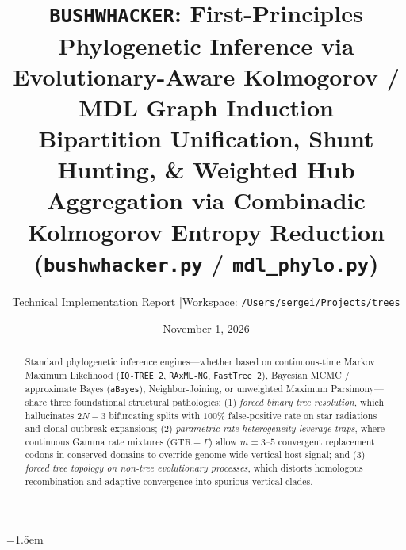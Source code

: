 \documentclass[11pt,a4paper]{article}
\title{\textbf{\texttt{BUSHWHACKER}: First-Principles Phylogenetic Inference via Evolutionary-Aware Kolmogorov / MDL Graph Induction}\\[0.4em]
\large \textbf{B}ipartition \textbf{U}nification, \textbf{S}hunt \textbf{H}unting, \& \textbf{W}eighted \textbf{H}ub \textbf{A}ggregation via \textbf{C}ombinadic \textbf{K}olmogorov \textbf{E}ntropy \textbf{R}eduction (\texttt{bushwhacker.py} / \texttt{mdl\_phylo.py})}
\author{Technical Implementation Report \quad|\quad Workspace: \texttt{/Users/sergei/Projects/trees}}
\date{November 1, 2026}
\begin{document}
\sloppy
\emergencystretch=1.5em
\maketitle

\begin{abstract}
Standard phylogenetic inference engines---whether based on continuous-time Markov Maximum Likelihood (\texttt{IQ-TREE 2}, \texttt{RAxML-NG}, \texttt{FastTree 2}), Bayesian MCMC / approximate Bayes (\texttt{aBayes}), Neighbor-Joining, or unweighted Maximum Parsimony---share three foundational structural pathologies: (1) \emph{forced binary tree resolution}, which hallucinates $2N-3$ bifurcating splits with $100\%$ false-positive rate on star radiations and clonal outbreak expansions; (2) \emph{parametric rate-heterogeneity leverage traps}, where continuous Gamma rate mixtures ($\text{GTR}+\Gamma$) allow $m=3\text{--}5$ convergent replacement codons in conserved domains to override genome-wide vertical host signal; and (3) \emph{forced tree topology on non-tree evolutionary processes}, which distorts homologous recombination and adaptive convergence into spurious vertical clades.


\end{abstract}
\end{document}

